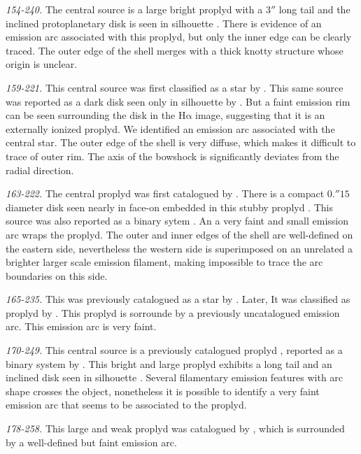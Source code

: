 \documentclass[apj, twocolumn]{aastex63}
\newcommand\ha{\ensuremath{\mathrm{H\alpha}}}
\begin{document}
\textit{154-240.} The central source is a large bright
proplyd \cite{Bally:2000a, Ricci:2008a} with a \(3''\)
long tail and the inclined protoplanetary disk is seen
in silhouette \citep{Bally:2000a}. There is evidence of
an emission arc associated with this proplyd, but only
the inner edge can be clearly traced. The outer edge of
the shell merges with a thick knotty structure whose origin
is unclear.

\textit{159-221.} This central source was first classified as
a star by \citet{ODell:1996a}. This same source was reported as
a dark disk seen only in silhouette by \citet{Ricci:2008a}.
But a faint emission rim can be seen surrounding the disk in
the \ha{} image, suggesting that it is an externally ionized
proplyd. We identified an emission arc associated with the
central star. The outer edge of the shell is very diffuse,
which  makes it difficult to trace of outer rim. The axis of
the bowshock is significantly deviates from the radial
direction.

\textit{163-222.} The central proplyd was first catalogued
by \citet{ODell:1996a}. There is a compact \(0.''15\) diameter
disk seen nearly in face-on embedded in this stubby
proplyd \citep{Bally:2000a, Ricci:2008a}.  This source
was also reported as a binary sytem \citep{Ricci:2008a}.
An a very faint and small emission arc wraps the proplyd.
The outer and inner edges of the shell are well-defined on
the eastern side, nevertheless the western side is superimposed
on an unrelated a brighter larger scale emission filament,
making impossible to trace the arc boundaries on this side.

\textit{165-235.} This was previously catalogued as a star
by \citet{ODell:1996a}. Later, It was classified as proplyd
by \citet{Ricci:2008a}. This proplyd is sorrounde by a
previously uncatalogued emission arc. This emission arc is
very faint.


\textit{170-249.} This central source is a previously
catalogued proplyd \citep{ODell:1996a}, reported as a
binary system by \citet{Ricci:2008a}. This bright and
large proplyd exhibits a long tail and an inclined disk
seen in silhouette \citep{Bally:2000a}. Several
filamentary emission features with arc shape crosses the
object, nonetheless it is possible to identify a very faint
emission arc that seems to be associated to the proplyd.  

\textit{178-258.}  This large and weak proplyd was catalogued
by \citet{Ricci:2008a}, which is surrounded by a well-defined
but faint emission arc.
\end{document}
